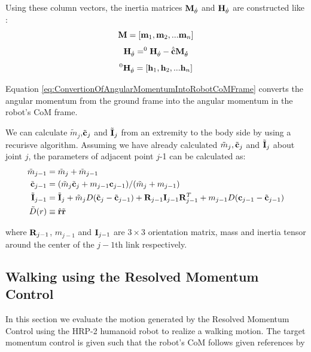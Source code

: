 Using these column vectors, the inertia matrices ${\bf M}_{\dot{\theta}}$ and 
${\bf H}_{\dot{\theta}}$ are constructed like :
\begin{equation}
{\bf M} =  [ {\bf m}_1, {\bf m}_2, ... {\bf m}_n] \\
\end{equation}
\begin{equation}
{\bf H}_{\dot{\theta}} = ^{0}{\bf H}_{\dot{\theta}} - \hat{\tilde{\bf c}} {\bf M}_{\dot{\theta}} \\
\label{eq:ConvertionOfAngularMomentumIntoRobotCoMFrame}
\end{equation}
\begin{equation}
^{0}{\bf H}_{\dot{\theta}} =  [ {\bf h}_1, {\bf h}_2, ... {\bf h}_n] \\
\end{equation}

Equation \ref{eq:ConvertionOfAngularMomentumIntoRobotCoMFrame} converts the angular 
momentum from the ground frame into the angular momentum in the robot's CoM frame.
\par
We can calculate $\tilde{m}_j$,$\tilde{\bf c}_j$ and $\tilde{\bf I}_j$ from an 
extremity to the body side by using a recurisve algorithm. Assuming we have 
already calculated $\tilde{m}_j, \tilde{\bf c}_j$ and $\tilde{\bf I}_j$ about joint $j$,
the parameters of adjacent point $j$-1  can be calculated as:
\begin{equation}
\begin{aligned}
\tilde{m}_{j-1} & = \tilde{m}_j + \tilde{m}_{j-1}\\
\tilde{\bf c}_{j-1} & = ( \tilde{m}_j\tilde{\bf c}_j + m_{j-1}{\bf c}_{j-1})/(\tilde{m}_j + m_{j-1}) \\
\tilde{\bf I}_{j-1} &= \tilde{\bf I}_j + \tilde{m}_j D (\tilde{\bf c}_j - \tilde{\bf c}_{j-1})
		+ {\bf R}_{j-1}{\bf I}_{j-1} {\bf R}^T_{j-1} 
	+ m_{j-1} D ({\bf c}_{j-1} - \tilde{\bf c}_{j-1})\\
\tilde D(r) & \equiv \hat{\bf r}\tilde{\bf r}\\
\end{aligned}	
\end{equation}

where ${\bf R}_{j-1}$, $m_{j-1}$ and ${\bf I}_{j-1}$ are $3 \times 3$ orientation matrix, mass
and inertia tensor around the center of the $j-1$th link respectively.


\subsection{Walking using the Resolved Momentum Control}
In this section we evaluate the motion generated by the Resolved Momentum Control 
using the HRP-2 humanoid robot to realize a walking motion.
The target momentum control is given such that the robot's CoM follows
given references by

